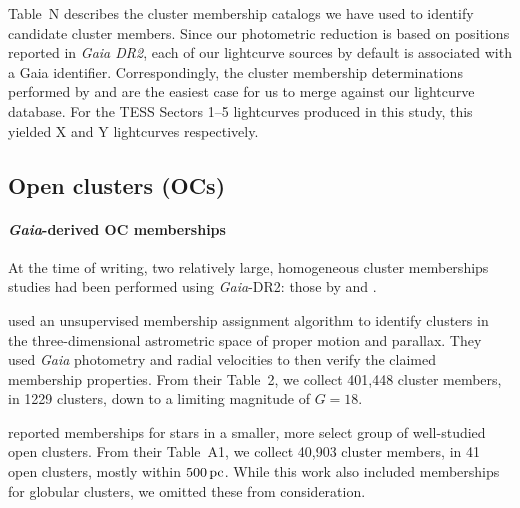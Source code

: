 \documentclass[12pt,twocolumn,tighten]{aastex62}
\begin{document}
Table~N describes the cluster membership catalogs we have used to
identify candidate cluster members.  Since our photometric reduction
is based on positions reported in {\it Gaia DR2}, each of our
lightcurve sources by default is associated with a Gaia identifier.
Correspondingly, the cluster membership determinations performed by
\citet{cantat-gaudin_gaia_2018} and \citet{gaia_hr_2018} are the
easiest case for us to merge against our lightcurve database.
For the TESS Sectors 1--5 lightcurves produced in this study, this
yielded X and Y lightcurves respectively.




\subsection{Open clusters (OCs)}
\label{subsec:oc}

\paragraph{{\it Gaia}-derived OC memberships}
At the time of writing, two relatively large, homogeneous cluster
memberships studies had been performed using {\it Gaia}-DR2: those by
\citet{cantat-gaudin_gaia_2018} and \citet{gaia_hr_2018}.

\citet{cantat-gaudin_gaia_2018} used an unsupervised membership
assignment algorithm to identify clusters in the three-dimensional
astrometric space of proper motion and parallax. They used {\it Gaia}
photometry and radial velocities to then verify the claimed
membership properties.  From their Table~2, we collect 401{,}448
cluster members, in 1229 clusters, down to a limiting magnitude of
$G=18$.

\citet{gaia_hr_2018} reported memberships for stars in a smaller, more
select group of well-studied open clusters. From their Table~A1, we
collect 40{,}903 cluster members, in 41 open clusters, mostly within
$500\,{\rm pc}$. While this work also included memberships for
globular clusters, we omitted these from consideration.
\end{document}
